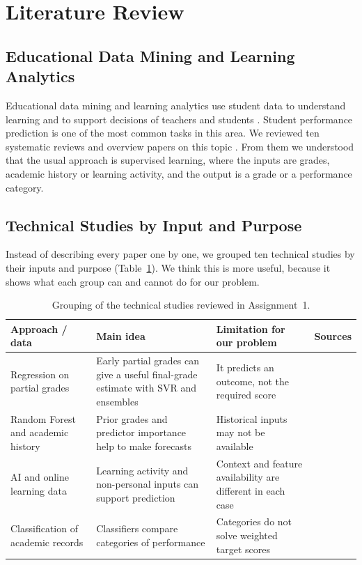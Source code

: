 \documentclass[10pt,twocolumn,a4paper]{article}
\begin{document}
\section{Literature Review}
\subsection{Educational Data Mining and Learning Analytics}
Educational data mining and learning analytics use student data to understand learning and to support decisions of teachers and students \cite{baker2009,siemens2011,romero2020}. Student performance prediction is one of the most common tasks in this area. We reviewed ten systematic reviews and overview papers on this topic \cite{namoun2021,zhang2021,sekeroglu2021,balaji2021,roslan2022,alalawi2023,alwarthan2022,chaka2022,almalawi2024,chen2025}. From them we understood that the usual approach is supervised learning, where the inputs are grades, academic history or learning activity, and the output is a grade or a performance category.

\subsection{Technical Studies by Input and Purpose}
Instead of describing every paper one by one, we grouped ten technical studies by their inputs and purpose (Table~\ref{tab:lit}). We think this is more useful, because it shows what each group can and cannot do for our problem.

\begin{table}[t]
\centering
\caption{Grouping of the technical studies reviewed in Assignment~1.}
\label{tab:lit}
\small
\begin{tabular}{p{2.7cm}p{3.9cm}p{4.3cm}p{3.9cm}}
\toprule
\textbf{Approach / data} & \textbf{Main idea} & \textbf{Limitation for our problem} & \textbf{Sources}\\
\midrule
Regression on partial grades & Early partial grades can give a useful final-grade estimate with SVR and ensembles & It predicts an outcome, not the required score & \cite{hidalgo2023}\\
Random Forest and academic history & Prior grades and predictor importance help to make forecasts & Historical inputs may not be available & \cite{musso2020,yagci2022,nachouki2023,alamgir2024,wang2022}\\
AI and online learning data & Learning activity and non-personal inputs can support prediction & Context and feature availability are different in each case & \cite{jiao2022,chavez2023}\\
Classification of academic records & Classifiers compare categories of performance & Categories do not solve weighted target scores & \cite{ahmed2024,khairy2024}\\
\bottomrule
\end{tabular}
\end{table}
\end{document}
